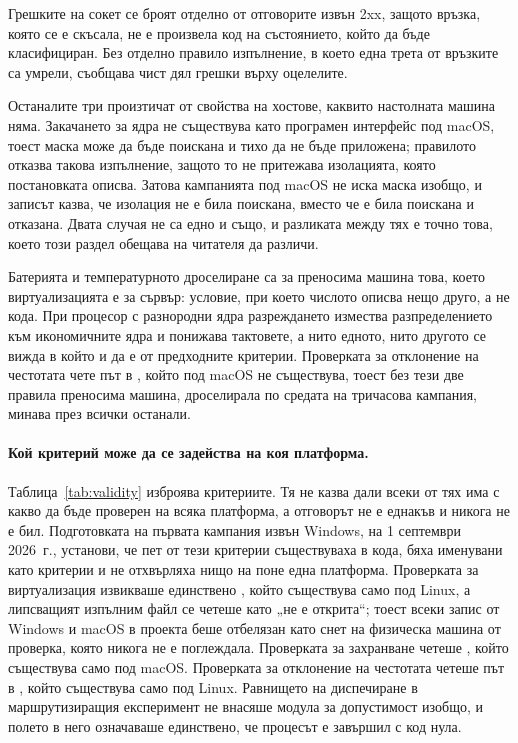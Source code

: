 Грешките на сокет се броят отделно от отговорите извън 2xx, защото връзка, която се е скъсала,
не е произвела код на състоянието, който да бъде класифициран. Без отделно правило изпълнение,
в което една трета от връзките са умрели, съобщава чист дял грешки върху оцелелите.

Останалите три произтичат от свойства на хостове, каквито настолната машина няма. Закачането за
ядра не съществува като програмен интерфейс под macOS, тоест маска може да бъде поискана и тихо
да не бъде приложена; правилото отказва такова изпълнение, защото то не притежава изолацията,
която постановката описва. Затова кампанията под macOS не иска маска изобщо, и записът казва, че
изолация не е била поискана, вместо че е била поискана и отказана. Двата случая не са едно и
също, и разликата между тях е точно това, което този раздел обещава на читателя да различи.

Батерията и температурното дроселиране са за преносима машина това, което виртуализацията е за
сървър: условие, при което числото описва нещо друго, а не кода. При процесор с разнородни ядра
разреждането измества разпределението към икономичните ядра и понижава тактовете, а нито едното,
нито другото се вижда в който и да е от предходните критерии. Проверката за отклонение на
честотата чете път в , който под macOS не съществува, тоест без тези две правила
преносима машина, дроселирала по средата на тричасова кампания, минава през всички останали.

\paragraph{Кой критерий може да се задейства на коя платформа.} Таблица~\ref{tab:validity}
изброява критериите. Тя не казва дали всеки от тях има с какво да бъде проверен на всяка
платформа, а отговорът не е еднакъв и никога не е бил. Подготовката на първата кампания извън
Windows, на 1 септември 2026~г., установи, че пет от тези критерии съществуваха в кода, бяха
именувани като критерии и не отхвърляха нищо на поне една платформа. Проверката за
виртуализация извикваше единствено , който съществува само под
Linux, а липсващият изпълним файл се четеше като „не е открита“; тоест всеки запис от Windows
и macOS в проекта беше отбелязан като снет на физическа машина от проверка, която никога не е
поглеждала. Проверката за захранване четеше , който съществува само под macOS.
Проверката за отклонение на честотата четеше път в , който съществува само под
Linux. Равнището на диспечиране в маршрутизиращия експеримент не внасяше модула за допустимост
изобщо, и полето  в него означаваше единствено, че процесът е завършил с код
нула.

